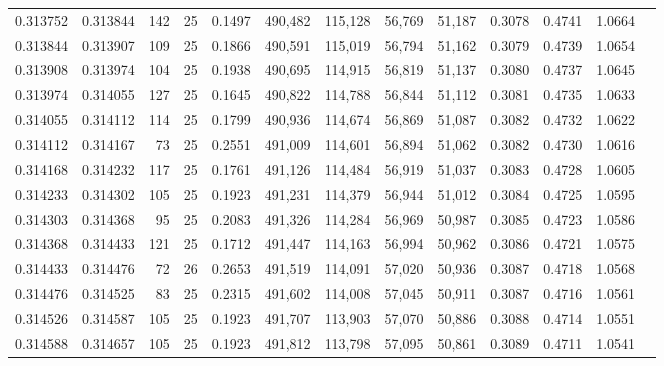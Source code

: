 \begin{tabular}{rrrrrrrrrrrrr}
0.313752 & 0.313844 &   142 &  25 &                                     0.1497 & 490,482 & 115,128 &  56,769 &  51,187 & 0.3078 & 0.4741 & 1.0664 \\
0.313844 & 0.313907 &   109 &  25 &                                     0.1866 & 490,591 & 115,019 &  56,794 &  51,162 & 0.3079 & 0.4739 & 1.0654 \\
0.313908 & 0.313974 &   104 &  25 &                                     0.1938 & 490,695 & 114,915 &  56,819 &  51,137 & 0.3080 & 0.4737 & 1.0645 \\
0.313974 & 0.314055 &   127 &  25 &                                     0.1645 & 490,822 & 114,788 &  56,844 &  51,112 & 0.3081 & 0.4735 & 1.0633 \\
0.314055 & 0.314112 &   114 &  25 &                                     0.1799 & 490,936 & 114,674 &  56,869 &  51,087 & 0.3082 & 0.4732 & 1.0622 \\
0.314112 & 0.314167 &    73 &  25 &                                     0.2551 & 491,009 & 114,601 &  56,894 &  51,062 & 0.3082 & 0.4730 & 1.0616 \\
0.314168 & 0.314232 &   117 &  25 &                                     0.1761 & 491,126 & 114,484 &  56,919 &  51,037 & 0.3083 & 0.4728 & 1.0605 \\
0.314233 & 0.314302 &   105 &  25 &                                     0.1923 & 491,231 & 114,379 &  56,944 &  51,012 & 0.3084 & 0.4725 & 1.0595 \\
0.314303 & 0.314368 &    95 &  25 &                                     0.2083 & 491,326 & 114,284 &  56,969 &  50,987 & 0.3085 & 0.4723 & 1.0586 \\
0.314368 & 0.314433 &   121 &  25 &                                     0.1712 & 491,447 & 114,163 &  56,994 &  50,962 & 0.3086 & 0.4721 & 1.0575 \\
0.314433 & 0.314476 &    72 &  26 &                                     0.2653 & 491,519 & 114,091 &  57,020 &  50,936 & 0.3087 & 0.4718 & 1.0568 \\
0.314476 & 0.314525 &    83 &  25 &                                     0.2315 & 491,602 & 114,008 &  57,045 &  50,911 & 0.3087 & 0.4716 & 1.0561 \\
0.314526 & 0.314587 &   105 &  25 &                                     0.1923 & 491,707 & 113,903 &  57,070 &  50,886 & 0.3088 & 0.4714 & 1.0551 \\
0.314588 & 0.314657 &   105 &  25 &                                     0.1923 & 491,812 & 113,798 &  57,095 &  50,861 & 0.3089 & 0.4711 & 1.0541 \\

\end{tabular}
